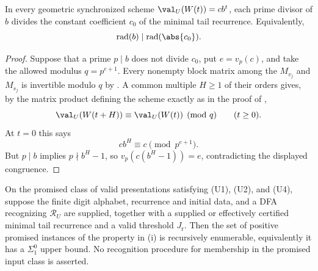 \begin{lemma}
  \label{lem:geometric-ratio-tail-support}
  In every geometric synchronized scheme
  \(\val_U(W(t))=cb^t\), each prime divisor of \(b\) divides the
  constant coefficient \(c_0\) of the minimal tail recurrence.  Equivalently,
  \[
    \operatorname{rad}(b)\mid\operatorname{rad}(\abs{c_0}).
  \]
\end{lemma}

\begin{proof}
  Suppose that a prime \(p\mid b\) does not divide \(c_0\), put
  \(e=v_p(c)\), and take the allowed modulus \(q=p^{e+1}\).  Every
  nonempty block matrix among the \(M_{v_j}\) and \(M_{s_j}\) is invertible
  modulo \(q\) by .  A common
  multiple \(H\ge1\) of their orders gives, by the matrix product defining
  the scheme exactly as in the proof of
  ,
  \[
    \val_U(W(t+H))\equiv\val_U(W(t))\pmod q
    \qquad(t\ge0).
  \]
  At \(t=0\) this says
  \[
    cb^H\equiv c\pmod {p^{e+1}}.
  \]
  But \(p\mid b\) implies \(p\nmid b^H-1\), so
  \(v_p(c(b^H-1))=e\), contradicting the displayed congruence.
\end{proof}

\begin{corollary}
  \label{cor:bounded-outside-support-semidecidable}
  On the promised class of valid presentations satisfying
  \textup{(U1)}, \textup{(U2)}, and \textup{(U4)}, suppose the finite
  digit alphabet, recurrence and initial data, and a DFA recognizing
  \(\mathcal R_U\) are supplied,
  together with a supplied or effectively certified minimal tail
  recurrence and a valid threshold \(J_{\mathrm r}\). Then the set of
  positive promised instances of the property in
  \textup{(i)} is
  recursively enumerable, equivalently it has a \(\Sigma^0_1\) upper
  bound. No recognition procedure for membership in the promised input
  class is asserted.
\end{corollary}

